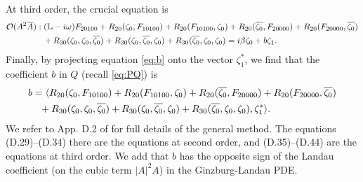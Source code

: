 \documentclass[11pt]{article}
\numberwithin{equation}{section}
\begin{document}
At third order, the crucial equation is
\begin{equation}\label{eq:b}
\begin{split} 
\mathcal{O}(A^2 \overline{A})&:
(\mathbb{L}- i \omega) F_{20100} + R_{20}(\zeta_0,F_{10100} ) + R_{20}(F_{10100},\zeta_0) + R_{20}(\overline{\zeta_0},F_{20000}) + R_{20}(F_{20000},\overline{\zeta_0}) \\
&{\hskip0.1truein} +R_{30}(\zeta_0,\zeta_0,\overline{\zeta_0}) + R_{30}(\zeta_0,\overline{\zeta_0},\zeta_0) + R_{30}(\overline{\zeta_0}, \zeta_0, \zeta_0 ) = i \beta \zeta_0 + b \zeta_1.
\end{split}
\end{equation}
%
Finally, by projecting equation \eqref{eq:b} onto the vector $\zeta_1^*$, we find that the coefficient $b$ in $Q$ (recall \eqref{eq:PQ}) is 
\begin{equation}\label{eq:def-b}
\begin{split} 
b &= \langle
R_{20}(\zeta_0,F_{10100} ) + R_{20}(F_{10100},\zeta_0) + R_{20}(\overline{\zeta_0},F_{20000}) + R_{20}(F_{20000},\overline{\zeta_0}) \\
&{\hskip0.1truein} +R_{30}(\zeta_0,\zeta_0,\overline{\zeta_0}) + R_{30}(\zeta_0,\overline{\zeta_0},\zeta_0) + R_{30}(\overline{\zeta_0}, \zeta_0, \zeta_0 ),
\zeta_1^*
\rangle.
\end{split}
\end{equation}
%
We refer to App. D.2 of \cite{HI2011} for full details of the general method.
The equations (D.29)--(D.34) there are the equations at second order,
and (D.35)--(D.44) are the equations at third order.
We add that $b$ has the opposite sign of the Landau coefficient (on the cubic term $\vert A\vert^2 A$) in the Ginzburg-Landau PDE.
\end{document}
